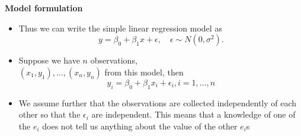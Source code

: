 \documentclass[landscape]{slides}
\newcommand{\heading}[1]{%
  \begin{center}
    \large\bf \color{red}
        #1
  \end{center}
  \vspace{1ex minus 1ex}}
\begin{document}
\begin{slide}
\heading{Model formulation}
\begin{itemize}

\item Thus we can write the simple linear regression model as
$$y=\beta_0+\beta_1 x+\epsilon, \quad \epsilon \sim N(0,\sigma^2).$$

\item Suppose we have $n$ observations, \\
$(x_1,y_1),\ldots,(x_n,y_n)$ from this model, then
$$y_i=\beta_0+\beta_1 x_i+\epsilon_i, i=1,\ldots, n$$
%
\item We assume further that the observations are collected independently of each other so that
the $\epsilon_i$ are independent. This means that a knowledge of one of the $e_i$ does not tell
us anything about the value of the other $e_i$s

\end{itemize}
\end{slide}
%
%
%


%
\end{document}
